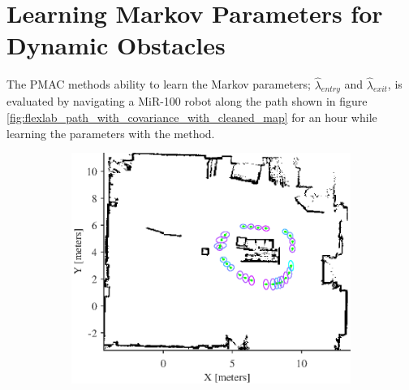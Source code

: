 \section{Learning Markov Parameters for Dynamic Obstacles}
\label{sec:learning_markov_evaluation}
The PMAC methods ability to learn the Markov parameters; $\hat{\lambda}_{entry}$ and $\hat{\lambda}_{exit}$, is evaluated by navigating a MiR-100 robot along the path shown in figure \ref{fig:flexlab_path_with_covariance_with_cleaned_map} for an hour while learning the parameters with the method.

\begin{figure}[htbp]
    \begin{subfigure}[t]{0.7\textwidth}	
        \centering	
        \includegraphics[scale=1.0]{chapters/evaluation/figures/flexlab_path_with_covariance_with_cleaned_map}
    \end{subfigure}
    \begin{subfigure}[t]{0.2\textwidth}
        \centering
    \end{subfigure}
    

\end{figure}
